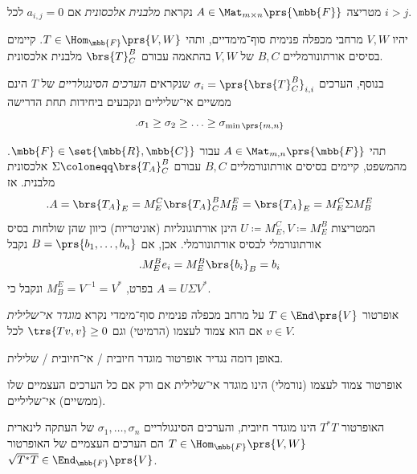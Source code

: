 \documentclass[a4paper,10pt,twoside,openany]{book}
\begin{document}
\begin{definition}
מטריצה
$A \in \Mat_{m \times n}\prs{\mbb{F}}$
נקראת
\emph{מלבנית אלכסונית}
אם
$a_{i,j} = 0$
לכל
$i > j$.
\end{definition}

\begin{theorem}
יהיו
$V,W$
מרחבי מכפלה פנימית סוף־מימדיים, ותהי
$T \in \Hom_{\mbb{F}}\prs{V,W}$.
קיימים בסיסים אורתונורמליים
$B,C$
של
$V,W$
בהתאמה עבורם
$\brs{T}^B_C$
מלבנית אלכסונית.

בנוסף, הערכים
$\sigma_i = \prs{\brs{T}^B_C}_{i,i}$
שנקראים
\emph{הערכים הסינגולריים}
של
$T$
הינם ממשיים אי־שליליים ונקבעים ביחידות תחת הדרישה
\[\text{.} \sigma_1 \geq \sigma_2 \geq \ldots \geq \sigma_{\min\prs{m,n}}\]
\end{theorem}

\begin{corollary} \label{corollary:matrix-svd}
תהי
$A \in \Mat_{m,n}\prs{\mbb{F}}$
עבור
$\mbb{F} \in \set{\mbb{R}, \mbb{C}}$.
מהמשפט, קיימים בסיסים אורתונורמליים
$B,C$
עבורם
$\Sigma \coloneqq \brs{T_A}^B_C$
אלכסונית מלבנית.
אז
\[\text{.} A = \brs{T_A}_E = M^C_E \brs{T_A}^B_C M^E_B = \brs{T_A}_E = M^C_E \Sigma M^E_B\]
המטריצות
$U \coloneqq M^C_E, V \coloneqq M^B_E$
הינן אורתוגונליות (אוניטריות) כיוון שהן שולחות בסיס אורתונורמלי לבסיס אורתונורמלי. אכן, אם
$B = \prs{b_1, \ldots, b_n}$
נקבל
\[\text{.} M^B_E e_i = M^B_E \brs{b_i}_B = b_i\]
בפרט,
$M^E_B = V^{-1} = V^*$
ונקבל כי
$A = U \Sigma V^*$.
\end{corollary}

\begin{definition}
אופרטור
$T \in \End\prs{V}$
על מרחב מכפלה פנימית סוף־מימדי נקרא
\emph{מוגדר אי־שלילית}
אם הוא צמוד לעצמו (הרמיטי) וגם
$\trs{Tv, v} \geq 0$
לכל
$v \in V$.
\end{definition}

\begin{remark}
באופן דומה נגדיר אופרטור מוגדר חיובית%
\slash%
אי־חיובית%
\slash
שלילית.
\end{remark}

\begin{proposition}
אופרטור צמוד לעצמו (נורמלי) הינו מוגדר אי־שלילית אם ורק אם כל הערכים העצמיים שלו (ממשיים) אי־שליליים.
\end{proposition}

\begin{proposition}
האופרטור
$T^* T$
הינו מוגדר חיובית, והערכים הסינגולריים
$\sigma_1, \ldots, \sigma_n$
של העתקה לינארית
$T \in \Hom_{\mbb{F}}\prs{V,W}$
הם הערכים העצמיים של האופרטור
$\sqrt{T^* T} \in \End_{\mbb{F}}\prs{V}$.
\end{proposition}
\end{document}
